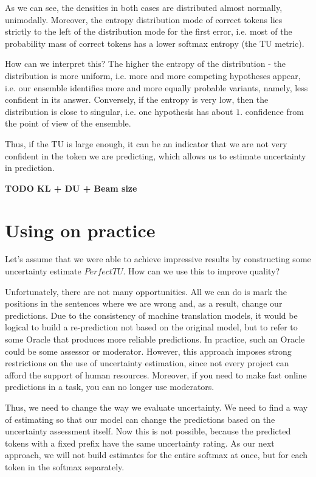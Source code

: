 \documentclass[a4paper,14pt]{extarticle}
\begin{document}
	As we can see, the densities in both cases are distributed almost normally, unimodally. Moreover, the entropy distribution mode of correct tokens lies strictly to the left of the distribution mode for the first error, i.e. most of the probability mass of correct tokens has a lower softmax entropy (the TU metric).

	How can we interpret this? The higher the entropy of the distribution - the distribution is more uniform, i.e. more and more competing hypotheses appear, i.e. our ensemble identifies more and more equally probable variants, namely, less confident in its answer. Conversely, if the entropy is very low, then the distribution is close to singular, i.e. one hypothesis has about $1.$ confidence from the point of view of the ensemble.

	Thus, if the TU is large enough, it can be an indicator that we are not very confident in the token we are predicting, which allows us to estimate uncertainty in prediction.
	
	\textbf{TODO KL + DU + Beam size}
	
\section{Using on practice}
	Let's assume that we were able to achieve impressive results by constructing some uncertainty estimate $PerfectTU$. How can we use this to improve quality?

	Unfortunately, there are not many opportunities. All we can do is mark the positions in the sentences where we are wrong and, as a result, change our predictions. Due to the consistency of machine translation models, it would be logical to build a re-prediction not based on the original model, but to refer to some Oracle that produces more reliable predictions. In practice, such an Oracle could be some assessor or moderator. However, this approach imposes strong restrictions on the use of uncertainty estimation, since not every project can afford the support of human resources. Moreover, if you need to make fast online predictions in a task, you can no longer use moderators.

	Thus, we need to change the way we evaluate uncertainty. We need to find a way of estimating so that our model can change the predictions based on the uncertainty assessment itself. Now this is not possible, because the predicted tokens with a fixed prefix have the same uncertainty rating. As our next approach, we will not build estimates for the entire softmax at once, but for each token in the softmax separately.
\end{document}
